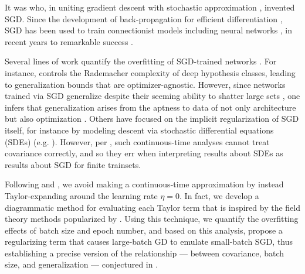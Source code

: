 \documentclass{article}
\begin{document}
    It was \citet{ki52} who, in uniting gradient descent \citep{ca47} with
    stochastic approximation \citep{ro51}, invented SGD.  Since the development
    of back-propagation for efficient differentiation \citep{we74}, SGD
    has been used to train connectionist models including neural
    networks \citep{bo91}, in recent years to remarkable success \citep{le15}.


    Several lines of work quantify the overfitting of SGD-trained networks
    \citep{ne17a}.  For instance, \citet{ba17} controls the Rademacher
    complexity of deep hypothesis classes, leading to generalization bounds
    that are optimizer-agnostic.  However, since networks trained via SGD
    generalize despite their seeming ability to shatter large sets
    \citep{zh17}, one infers that generalization arises from the aptness to
    data of not only architecture but also optimization \citep{ne17b}.  Others
    have focused on the implicit regularization of SGD itself, for instance by
    modeling descent via stochastic differential equations (SDEs) (e.g.
    \citet{ch18}).  However, per \citet{ya19}, such continuous-time analyses
    cannot treat covariance correctly, and so they err when interpreting
    results about SDEs as results about SGD for finite trainsets.


    Following \citet{li17} and \citet{ro18}, we avoid making a continuous-time
    approximation by instead Taylor-expanding around the learning rate
    $\eta=0$.  In fact, we develop a diagrammatic method for evaluating each
    Taylor term that is inspired by the field theory methods popularized by
    \citet{dy49a}.  Using this technique, we quantify the overfitting effects
    of batch size and epoch number, and based on this analysis, propose a
    regularizing term that causes large-batch GD to emulate small-batch SGD,
    thus establishing a precise version of the relationship --- between
    covariance, batch size, and generalization --- conjectured in
    \citet{ja18}.  
    
\end{document}
